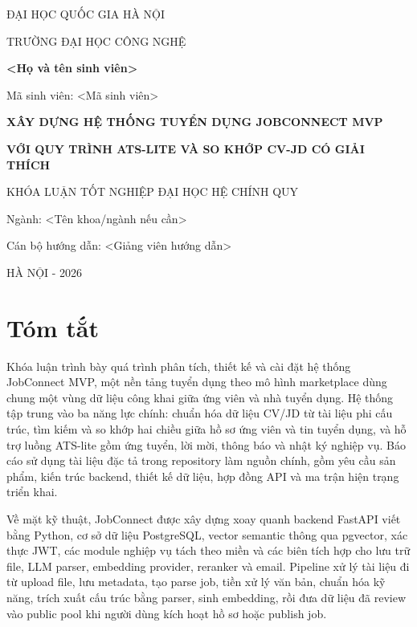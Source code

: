 \documentclass[12pt,a4paper,oneside]{extreport}
\newcommand{\placeholder}[1]{\textless{}#1\textgreater{}}
\begin{document}
\fontsize{13pt}{16.9pt}\selectfont

\begin{titlepage}
  \centering
  {\large ĐẠI HỌC QUỐC GIA HÀ NỘI\par}
  {\large TRƯỜNG ĐẠI HỌC CÔNG NGHỆ\par}
  \vspace{2.2cm}
  {\Large \textbf{\placeholder{Họ và tên sinh viên}}\par}
  {\large Mã sinh viên: \placeholder{Mã sinh viên}\par}
  \vspace{2.8cm}
  {\Huge \bfseries XÂY DỰNG HỆ THỐNG TUYỂN DỤNG JOBCONNECT MVP\par}
  \vspace{0.4cm}
  {\Large \bfseries VỚI QUY TRÌNH ATS-LITE VÀ SO KHỚP CV-JD CÓ GIẢI THÍCH\par}
  \vfill
  {\large KHÓA LUẬN TỐT NGHIỆP ĐẠI HỌC HỆ CHÍNH QUY\par}
  {\large Ngành: \placeholder{Tên khoa/ngành nếu cần}\par}
  \vspace{1.2cm}
  {\large Cán bộ hướng dẫn: \placeholder{Giảng viên hướng dẫn}\par}
  \vfill
  {\large HÀ NỘI - 2026\par}
\end{titlepage}


\chapter*{Tóm tắt}
Khóa luận trình bày quá trình phân tích, thiết kế và cài đặt hệ thống JobConnect MVP, một nền tảng tuyển dụng theo mô hình marketplace dùng chung một vùng dữ liệu công khai giữa ứng viên và nhà tuyển dụng. Hệ thống tập trung vào ba năng lực chính: chuẩn hóa dữ liệu CV/JD từ tài liệu phi cấu trúc, tìm kiếm và so khớp hai chiều giữa hồ sơ ứng viên và tin tuyển dụng, và hỗ trợ luồng ATS-lite gồm ứng tuyển, lời mời, thông báo và nhật ký nghiệp vụ. Báo cáo sử dụng tài liệu đặc tả trong repository làm nguồn chính, gồm yêu cầu sản phẩm, kiến trúc backend, thiết kế dữ liệu, hợp đồng API và ma trận hiện trạng triển khai.

Về mặt kỹ thuật, JobConnect được xây dựng xoay quanh backend FastAPI viết bằng Python, cơ sở dữ liệu PostgreSQL, vector semantic thông qua pgvector, xác thực JWT, các module nghiệp vụ tách theo miền và các biên tích hợp cho lưu trữ file, LLM parser, embedding provider, reranker và email. Pipeline xử lý tài liệu đi từ upload file, lưu metadata, tạo parse job, tiền xử lý văn bản, chuẩn hóa kỹ năng, trích xuất cấu trúc bằng parser, sinh embedding, rồi đưa dữ liệu đã review vào public pool khi người dùng kích hoạt hồ sơ hoặc publish job.
\end{document}
